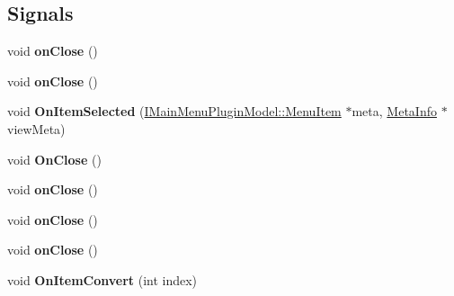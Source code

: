 \subsection*{Signals}
\begin{DoxyCompactItemize}
\item 
void {\bfseries on\+Close} ()\hypertarget{class_main_form_af5c793d14da28ffb85334e9788f64756}{}\label{class_main_form_af5c793d14da28ffb85334e9788f64756}

\item 
void {\bfseries on\+Close} ()\hypertarget{class_main_form_af5c793d14da28ffb85334e9788f64756}{}\label{class_main_form_af5c793d14da28ffb85334e9788f64756}

\item 
void {\bfseries On\+Item\+Selected} (\hyperlink{struct_i_main_menu_plugin_model_1_1_menu_item}{I\+Main\+Menu\+Plugin\+Model\+::\+Menu\+Item} $\ast$meta, \hyperlink{struct_meta_info}{Meta\+Info} $\ast$view\+Meta)\hypertarget{class_main_form_add09750f28044115c869ec8f6d6b86ef}{}\label{class_main_form_add09750f28044115c869ec8f6d6b86ef}

\item 
void {\bfseries On\+Close} ()\hypertarget{class_main_form_ae51e9ea97c7c12d0d8b59cb295f8018b}{}\label{class_main_form_ae51e9ea97c7c12d0d8b59cb295f8018b}

\item 
void {\bfseries on\+Close} ()\hypertarget{class_main_form_af5c793d14da28ffb85334e9788f64756}{}\label{class_main_form_af5c793d14da28ffb85334e9788f64756}

\item 
void {\bfseries on\+Close} ()\hypertarget{class_main_form_af5c793d14da28ffb85334e9788f64756}{}\label{class_main_form_af5c793d14da28ffb85334e9788f64756}

\item 
void {\bfseries on\+Close} ()\hypertarget{class_main_form_af5c793d14da28ffb85334e9788f64756}{}\label{class_main_form_af5c793d14da28ffb85334e9788f64756}

\item 
void {\bfseries On\+Item\+Convert} (int index)\hypertarget{class_main_form_a9f87a145f41c5b1bf064415f79423586}{}\label{class_main_form_a9f87a145f41c5b1bf064415f79423586}

\end{DoxyCompactItemize}
